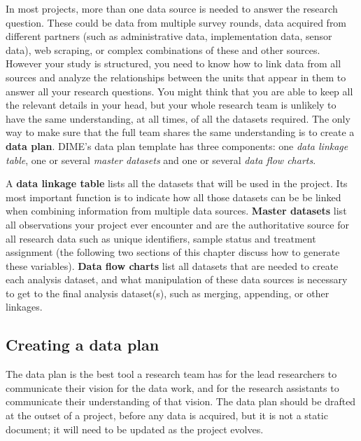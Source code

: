 In most projects, more than one data source is needed to answer the research question.
These could be data from multiple survey rounds,
data acquired from different partners (such as administrative data, implementation data, sensor data),
web scraping, 
or complex combinations of these and other sources. 
However your study is structured, you need to know how to link data from all sources
and analyze the relationships between the units that appear in them
to answer all your research questions.
You might think that you are able to keep all the relevant details in your head,
but your whole research team is unlikely to have the same understanding,
at all times, of all the datasets required.
The only way to make sure that the full team shares the same understanding
is to create a \textbf{data plan}.
DIME's data plan template has three components:
one \textit{data linkage table},
one or several \textit{master datasets}
and one or several \textit{data flow charts}. 

A \textbf{data linkage table}
lists all the datasets that will be used in the project.
Its most important function is to indicate 
how all those datasets can be be linked when
combining information from multiple data sources.
\textbf{Master datasets}
list all observations your project ever encounter
and are the authoritative source for all research data
such as unique identifiers, sample status and treatment assignment 
(the following two sections of this chapter discuss how to generate these variables). 
\textbf{Data flow charts}
list all datasets that are needed to create each analysis dataset,
and what manipulation of these data sources is necessary 
to get to the final analysis dataset(s), 
such as merging, appending, or other linkages. 

\subsection{Creating a data plan}

The data plan is the best tool a research team has for
the lead researchers to communicate their vision for the data work, 
and for the research assistants to communicate their understanding of that vision.
The data plan should be drafted at the outset of a project, 
before any data is acquired, 
but it is not a static document;
it will need to be updated as the project evolves.

